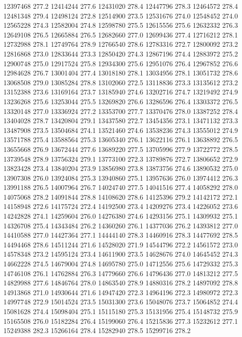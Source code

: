 12397468 277.2
12414244 277.6
12431020 278.4
12447796 278.3
12464572 278.4
12481348 279.4
12498124 272.8
12514900 273.5
12531676 274.0
12548452 274.0
12565228 274.3
12582004 274.8
12598780 275.5
12615556 275.6
12632332 276.3
12649108 276.5
12665884 276.5
12682660 277.0
12699436 277.4
12716212 278.1
12732988 278.1
12749764 278.9
12766540 278.6
12783316 272.7
12800092 273.2
12816868 273.0
12833644 273.3
12850420 274.3
12867196 274.4
12883972 275.2
12900748 275.0
12917524 275.8
12934300 275.6
12951076 276.4
12967852 276.6
12984628 276.7
13001404 277.4
13018180 278.1
13034956 278.1
13051732 278.6
13068508 279.0
13085284 278.8
13102060 272.5
13118836 273.3
13135612 273.2
13152388 273.6
13169164 273.7
13185940 274.6
13202716 274.7
13219492 274.9
13236268 275.6
13253044 275.5
13269820 276.6
13286596 276.4
13303372 276.5
13320148 277.0
13336924 277.2
13353700 277.7
13370476 278.0
13387252 278.4
13404028 278.7
13420804 279.1
13437580 272.7
13454356 273.1
13471132 273.3
13487908 273.5
13504684 274.1
13521460 274.6
13538236 274.3
13555012 274.9
13571788 275.4
13588564 275.3
13605340 276.1
13622116 276.1
13638892 276.5
13655668 276.9
13672444 277.6
13689220 277.5
13705996 277.9
13722772 278.5
13739548 278.9
13756324 279.1
13773100 272.3
13789876 272.7
13806652 272.9
13823428 273.4
13840204 273.9
13856980 273.8
13873756 274.6
13890532 275.0
13907308 276.0
13924084 275.3
13940860 275.1
13957636 276.0
13974412 276.3
13991188 276.5
14007964 276.7
14024740 277.5
14041516 277.4
14058292 278.0
14075068 278.2
14091844 278.8
14108620 278.6
14125396 279.2
14142172 272.1
14158948 272.6
14175724 272.4
14192500 273.4
14209276 273.4
14226052 273.6
14242828 274.1
14259604 276.0
14276380 274.6
14293156 275.1
14309932 275.1
14326708 275.4
14343484 276.2
14360260 276.1
14377036 276.2
14393812 277.0
14410588 277.0
14427364 277.1
14444140 278.3
14460916 278.3
14477692 278.5
14494468 278.6
14511244 271.6
14528020 271.9
14544796 272.2
14561572 273.0
14578348 273.2
14595124 273.4
14611900 273.5
14628676 274.0
14645452 274.3
14662228 274.5
14679004 274.8
14695780 275.0
14712556 275.6
14729332 275.3
14746108 276.1
14762884 276.3
14779660 276.6
14796436 277.0
14813212 277.5
14829988 277.6
14846764 278.0
14863540 278.9
14880316 278.2
14897092 278.8
14913868 271.0
14930644 271.6
14947420 272.3
14964196 272.3
14980972 272.3
14997748 272.9
15014524 273.5
15031300 273.6
15048076 273.7
15064852 274.4
15081628 274.4
15098404 275.1
15115180 275.3
15131956 275.4
15148732 275.9
15165508 276.0
15182284 276.4
15199060 276.4
15215836 277.3
15232612 277.1
15249388 282.3
15266164 278.4
15282940 278.5
15299716 278.2
